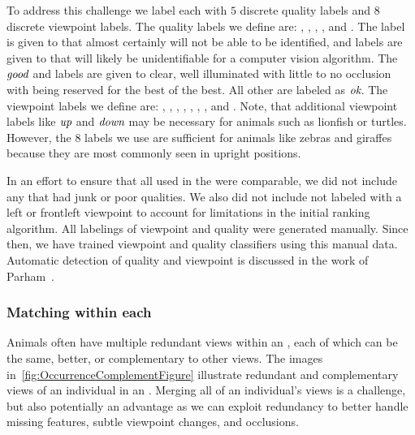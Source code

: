             To address this challenge we label each \annot{} with $5$ discrete quality labels and $8$ discrete viewpoint
            labels. The quality labels we define are: \qualJunk{}, \qualPoor{}, \qualOk{}, \qualGood{}, and
            \qualExcellent{}. The \qualJunk{} label is given to \annots{} that almost certainly will not be able to be
            identified, and \qualPoor{} labels are given to \annots{} that will likely be unidentifiable for a computer
            vision algorithm. The $\emph{good}{}$ and \qualExcellent{} labels are given to clear, well illuminated
            \annots{} with little to no occlusion with \qualExcellent{} being reserved for the best of the best. All
            other \annots{} are labeled as $\emph{ok}$. The viewpoint labels we define are: \vpFront{}, \vpFrontLeft{},
            \vpLeft{}, \vpBackLeft{}, \vpBack{}, \vpBackRight{}, \vpBack{}, and \vpFrontRight{}. Note, that additional
            viewpoint labels like $\emph{up}{}$ and $\emph{down}{}$ may be necessary for animals such as lionfish or turtles.
            However, the $8$ labels we use are sufficient for animals like zebras and giraffes because they are most
            commonly seen in upright positions.

            In an effort to ensure that all \annots{} used in the \GZC{} were comparable, we did not include any
            \annot{} that had junk or poor qualities. We also did not include \annots{} not labeled with a left or
            frontleft viewpoint to account for limitations in the initial ranking algorithm. All labelings of
            viewpoint and quality were generated manually. Since then, we have trained viewpoint and quality
            classifiers using this manual data. Automatic detection of quality and viewpoint is discussed in the
            work of Parham~\cite{parham_photographic_2015}.

        \subsubsection{Matching within each \occurrence{}} %
            Animals often have multiple redundant views within an \occurrence{}, each of which can be the same,
            better, or complementary to other views. The images in~\cref{fig:OccurrenceComplementFigure} illustrate
            redundant and complementary views of an individual in an \occurrence{}. Merging all of an individual's
            views is a challenge, but also potentially an advantage as we can exploit redundancy to better handle
            missing features, subtle viewpoint changes, and occlusions.


